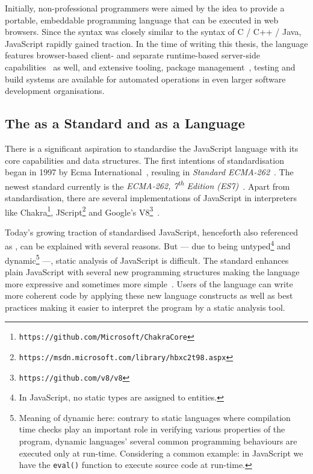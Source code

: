 Initially, non-professional programmers were aimed by the idea to provide a portable, embeddable programming language that can be executed in web browsers. Since the syntax was closely similar to the syntax of C / C++ / Java, JavaScript rapidly gained traction. In the time of writing this thesis, the language features browser-based client- and separate runtime-based server-side capabilities~\cite{nodejs} as well, and extensive tooling, package management~\cite{npmjs}, testing and build systems are available for automated operations in even larger software development organisations.


\subsection{The \es as a Standard and as a Language}

There is a significant aspiration to standardise the JavaScript language with its core capabilities and data structures. The first intentions of standardisation began in 1997 by Ecma International~\cite{webedjavascripthistory}, resuling in \emph{Standard ECMA-262}~\cite{ecmascriptstandardfirstversion}. The newest standard currently is the \emph{ECMA-262, 7\textsuperscript{th} Edition (ES7)}~\cite{ecmascriptstandard}. Apart from standardisation, there are several implementations of JavaScript in interpreters like Chakra\footnote{\texttt{https://github.com/Microsoft/ChakraCore}}, JScript\footnote{\texttt{https://msdn.microsoft.com/library/hbxc2t98.aspx}} and Google's V8\footnote{\texttt{https://github.com/v8/v8}}~\cite{stein-daniel-msc}.

Today's growing traction of standardised JavaScript, henceforth also referenced as \es, can be explained with several reasons. But — due to being untyped\footnote{In JavaScript, no static types are assigned to entities.} and dynamic\footnote{Meaning of dynamic here: contrary to static languages where compilation time checks play an important role in verifying various properties of the program, dynamic languages' several common programming behaviours are executed only at run-time. Considering a common example: in JavaScript we have the \lstinline{eval()} function to execute source code at run-time.} —, static analysis of JavaScript is difficult. The \es standard enhances plain JavaScript with several new programming structures making the language more expressive and sometimes more simple~\cite{es6-features}. Users of the language can write more coherent code by applying these new language constructs as well as best practices making it easier to interpret the program by a static analysis tool.


